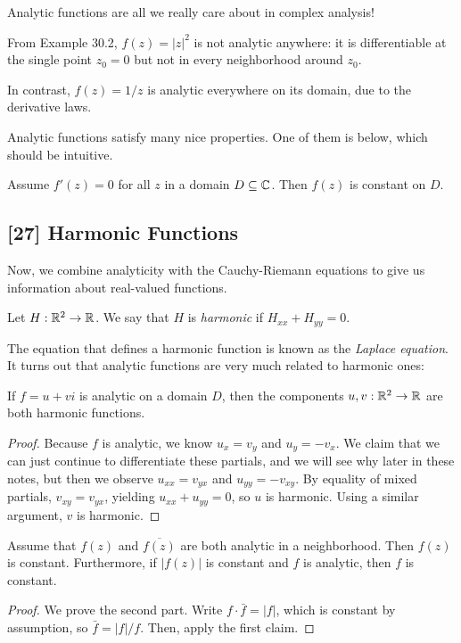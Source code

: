 \documentclass{article}
\begin{document}
Analytic functions are all we really care about in complex analysis! \newpage

\begin{example}
From Example 30.2, $f(z) = |z|^2$ is not analytic anywhere: it is differentiable at the single point $z_0 = 0$ but not in every neighborhood around $z_0$.
\end{example}
\begin{example}
In contrast, $f(z) = 1/z$ is analytic everywhere on its domain, due to the derivative laws.
\end{example}

Analytic functions satisfy many nice properties. One of them is below, which should be intuitive.
\begin{theorem}
Assume $f'(z) = 0$ for all $z$ in a domain $D\subseteq \mathbb C$. Then $f(z)$ is constant on $D$.
\end{theorem}

\subsection*{[27] Harmonic Functions}
Now, we combine analyticity with the Cauchy-Riemann equations to give us information about real-valued functions.
\begin{definition}
Let $H:\mathbb R^2\to \mathbb R$. We say that $H$ is \textit{harmonic} if $H_{xx} + H_{yy} = 0$.
\end{definition}
The equation that defines a harmonic function is known as the \textit{Laplace equation}. It turns out that analytic functions are very much related to harmonic ones:
\begin{theorem}
If $f = u+vi$ is analytic on a domain $D$, then the components $u, v:\mathbb R^2\to \mathbb R$ are both harmonic functions.
\end{theorem}
\begin{proof}
Because $f$ is analytic, we know $u_x = v_y$ and $u_y = -v_x$. We claim that we can just continue to differentiate these partials, and we will see why later in these notes, but then we observe $u_{xx} = v_{yx}$ and $u_{yy} = -v_{xy}$. By equality of mixed partials, $v_{xy} = v_{yx}$, yielding $u_{xx} + u_{yy} = 0$, so $u$ is harmonic. Using a similar argument, $v$ is harmonic.
\end{proof}
\begin{proposition}
Assume that $f(z)$ and $\overline{f(z)}$ are both analytic in a neighborhood. Then $f(z)$ is constant. Furthermore, if $|f(z)|$ is constant and $f$ is analytic, then $f$ is constant.
\end{proposition}
\begin{proof}
We prove the second part. Write $f\cdot \bar f = |f|$, which is constant by assumption, so $\bar f = |f|/f$. Then, apply the first claim.
\end{proof}
\setcounter{section}{33}
\end{document}
